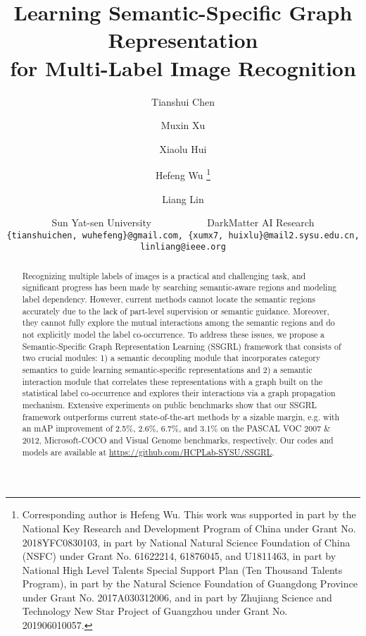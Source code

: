 \documentclass[10pt,twocolumn,letterpaper]{article}
\begin{document}
\title{Learning Semantic-Specific Graph Representation \\ for Multi-Label Image Recognition}
 \author{Tianshui Chen \and Muxin Xu \and Xiaolu Hui \and Hefeng Wu \thanks{Corresponding author is Hefeng Wu. This work was supported in part by the National Key Research and Development Program of China under Grant No. 2018YFC0830103, in part by National Natural Science Foundation of China (NSFC) under Grant No. 61622214, 61876045, and U1811463, in part by National High Level Talents Special Support Plan (Ten Thousand Talents Program), in part by the Natural Science Foundation of Guangdong Province under Grant No. 2017A030312006, and in part by Zhujiang Science and Technology New Star Project of Guangzhou under Grant No. 201906010057.} \and Liang Lin\vspace{1ex}\\
 \and Sun Yat-sen University ~~~~~~~~~~ DarkMatter AI Research \\
 {\tt\small \{tianshuichen, wuhefeng\}@gmail.com, \{xumx7, huixlu\}@mail2.sysu.edu.cn, linliang@ieee.org}
}

\maketitle
\ificcvfinal\thispagestyle{empty}\fi

\begin{abstract}
Recognizing multiple labels of images is a practical and challenging task, and significant progress has been made by searching semantic-aware regions and modeling label dependency. However, current methods cannot locate the semantic regions accurately due to the lack of part-level supervision or semantic guidance. Moreover, they cannot fully explore the mutual interactions among the semantic regions and do not explicitly model the label co-occurrence. To address these issues, we propose a Semantic-Specific Graph Representation Learning (SSGRL) framework that consists of two crucial modules: 1) a semantic decoupling module that incorporates category semantics to guide learning semantic-specific representations and 2) a semantic interaction module that correlates these representations with a graph built on the statistical label co-occurrence and explores their interactions via a graph propagation mechanism. Extensive experiments on public benchmarks show that our SSGRL framework outperforms current state-of-the-art methods by a sizable margin, e.g. with an mAP improvement of 2.5\%, 2.6\%, 6.7\%, and 3.1\% on the PASCAL VOC 2007 \& 2012, Microsoft-COCO and Visual Genome benchmarks, respectively. Our codes and models are available at \url{https://github.com/HCPLab-SYSU/SSGRL}.
\end{abstract}
\end{document}
